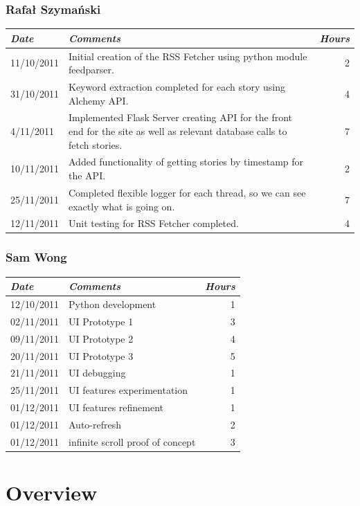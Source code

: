 \documentclass[a4paper,12pt]{article}
\begin{document}
	  \subsubsection{Rafał Szymański}
	    \begin{tabular}{l | p{10cm} r}
	     \emph{\large Date} & \emph{\large Comments} & \emph{\large Hours}\\
	     \hline
	     11/10/2011 & Initial creation of the RSS Fetcher using python module feedparser. & 2\\
       31/10/2011 & Keyword extraction completed for each story using Alchemy API. & 4\\
       4/11/2011 & Implemented Flask Server creating API for the front end for the site as well as relevant database calls to fetch stories. & 7\\
       10/11/2011 & Added functionality of getting stories by timestamp for the API. & 2\\
       25/11/2011 & Completed flexible logger for each thread, so we can see exactly what is going on. & 7\\
       12/11/2011 & Unit testing for RSS Fetcher completed. & 4
	    \end{tabular}
	  
	  \subsubsection{Sam Wong}
	  \begin{tabular}{l | p{10cm} r}
     \emph{\large Date} & \emph{\large Comments} & \emph{\large Hours}\\
     \hline
	   12/10/2011 & Python development & 1\\
     02/11/2011 & UI Prototype 1 & 3\\
     09/11/2011 & UI Prototype 2 & 4\\
     20/11/2011 & UI Prototype 3 & 5\\
     21/11/2011 & UI debugging & 1\\
     25/11/2011 & UI features experimentation & 1\\
     01/12/2011 & UI features refinement & 1\\
     01/12/2011 & Auto-refresh & 2\\
     01/12/2011 & infinite scroll proof of concept & 3\\
    \end{tabular}

		\section{Overview}
		
\end{document}
